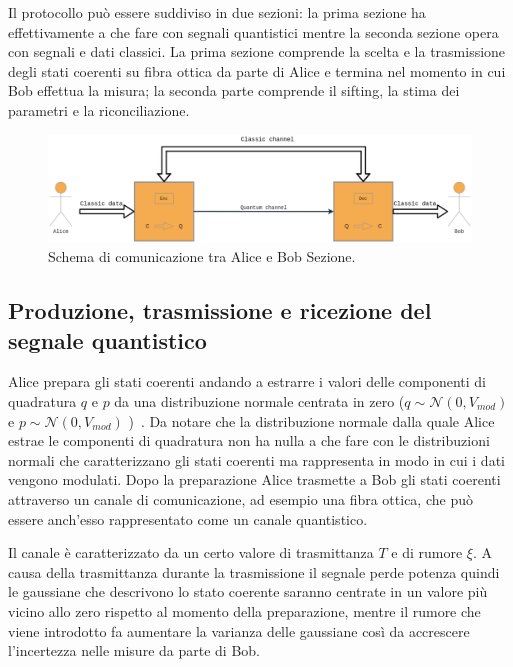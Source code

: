 Il protocollo pu\`o essere suddiviso in due sezioni: la prima sezione ha effettivamente a che fare con segnali quantistici mentre la seconda sezione opera con segnali e dati classici. La prima sezione comprende la scelta e la trasmissione degli stati coerenti su fibra ottica da parte di Alice e termina nel momento in cui Bob effettua la misura; la seconda parte comprende il sifting, la stima dei parametri e la riconciliazione.

\begin{figure}[H] 
\begin{center}
\includegraphics[width=\textwidth]{figure/alice_bob_communication.eps} 
\end{center}
\caption{Schema di comunicazione tra Alice e Bob Sezione.} \label{fig:alice-bob-schema}
\end{figure}

\subsection{Produzione, trasmissione e ricezione del segnale quantistico}\label{subse:sottosezione2-1-1}
Alice prepara gli stati coerenti andando a estrarre i valori delle componenti di quadratura $q$ e $p$ da una distribuzione normale centrata in zero ($q \sim {\mathcal N(0, V_{mod})}$ e $p \sim {\mathcal N(0, V_{mod})}$ )~\cite{https://doi.org/10.1002/qute.201800011}. Da notare che la distribuzione normale dalla quale Alice estrae le componenti di quadratura non ha nulla a che fare con le distribuzioni normali che caratterizzano gli stati coerenti ma rappresenta in modo in cui i dati vengono modulati. Dopo la preparazione Alice trasmette a Bob gli stati coerenti attraverso un canale di comunicazione, ad esempio una fibra ottica, che può essere anch'esso rappresentato come un canale quantistico.

Il canale \`e caratterizzato da un certo valore di trasmittanza $T$ e di rumore $\xi$. A causa della trasmittanza durante la trasmissione il segnale perde potenza quindi le gaussiane che descrivono lo stato coerente saranno centrate in un valore pi\`u vicino allo zero rispetto al momento della preparazione, mentre il rumore che viene introdotto fa aumentare la varianza delle gaussiane cos\`i da accrescere l'incertezza nelle misure da parte di Bob.

